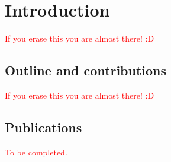\chapter{Introduction}\label{ch:introduction}

\textcolor{red}{If you erase this you are almost there! :D}

\section{Outline and contributions}

\textcolor{red}{If you erase this you are almost there! :D}

\section{Publications}

\textcolor{red}{To be completed.}
